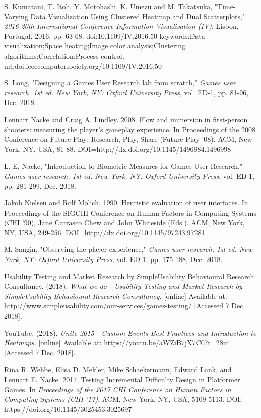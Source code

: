 \documentclass[journal]{IEEEtran}
\begin{document}
\begin{thebibliography}{17}
S. Kumatani, T. Itoh, Y. Motohashi, K. Umezu and M. Takatsuka, "Time-Varying Data Visualization Using Clustered Heatmap and Dual Scatterplots," \emph{2016 20th International Conference Information Visualisation (IV)}, Lisbon, Portugal, 2016, pp. 63-68. doi:10.1109/IV.2016.50 keywords:{Data visualization;Space heating;Image color analysis;Clustering algorithms;Correlation;Process control},
url:doi.ieeecomputersociety.org/10.1109/IV.2016.50

S. Long, "Designing a Games User Research lab from scratch," \emph{Games user research. 1st ed. New York, NY: Oxford University Press}, vol. ED-1, pp. 81-96, Dec. 2018.

Lennart Nacke and Craig A. Lindley. 2008. Flow and immersion in first-person shooters: measuring the player's gameplay experience. In Proceedings of the 2008 Conference on Future Play: Research, Play, Share (Future Play '08). ACM, New York, NY, USA, 81-88. DOI=http://dx.doi.org/10.1145/1496984.1496998

L. E. Nacke, "Introduction to Biometric Measures for Games User Research," \emph{Games user research. 1st ed. New York, NY: Oxford University Press}, vol. ED-1, pp. 281-299, Dec. 2018.

Jakob Nielsen and Rolf Molich. 1990. Heuristic evaluation of user interfaces. In Proceedings of the SIGCHI Conference on Human Factors in Computing Systems (CHI '90), Jane Carrasco Chew and John Whiteside (Eds.). ACM, New York, NY, USA, 249-256. DOI=http://dx.doi.org/10.1145/97243.97281

M. Sangin, "Observing the player experience," \emph{Games user research. 1st ed. New York, NY: Oxford University Press}, vol. ED-1, pp. 175-188, Dec. 2018.

Usability Testing and Market Research by SimpleUsability Behavioural Research Consultancy. (2018). \emph{What we do - Usability Testing and Market Research by SimpleUsability Behavioural Research Consultancy.} [online] Available at: http://www.simpleusability.com/our-services/games-testing/ [Accessed 7 Dec. 2018].

YouTube. (2018). \emph{Unite 2015 - Custom Events Best Practices and Introduction to Heatmaps.} [online] Available at: https://youtu.be/aWZiB7jX7C0?t=28m [Accessed 7 Dec. 2018].

Rina R. Wehbe, Elisa D. Mekler, Mike Schaekermann, Edward Lank, and Lennart E. Nacke. 2017. Testing Incremental Difficulty Design in Platformer Games. In \emph{Proceedings of the 2017 CHI Conference on Human Factors in Computing Systems (CHI '17)}. ACM, New York, NY, USA, 5109-5113. DOI: https://doi.org/10.1145/3025453.3025697


\end{thebibliography}
\end{document}
